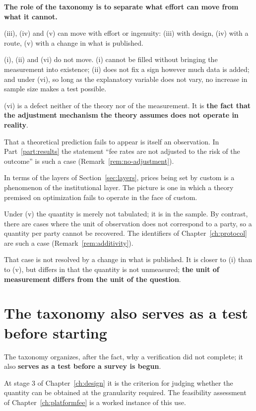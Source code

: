 \textbf{The role of the taxonomy is to separate what effort can move from what it cannot.}

(iii), (iv) and (v) can move with effort or ingenuity: (iii) with design, (iv) with a route,
(v) with a change in what is published.

(i), (ii) and (vi) do not move. (i) cannot be filled without bringing the measurement into
existence; (ii) does not fix a sign however much data is added; and under (vi), so long as
the explanatory variable does not vary, no increase in sample size makes a test possible.

\begin{remark}
\label{rem:vi-is-observation}
(vi) is a defect neither of the theory nor of the measurement. It is
\textbf{the fact that the adjustment mechanism the theory assumes does not operate in
reality}.

That a theoretical prediction fails to appear is itself an observation. In
Part~\ref{part:results} the statement ``fee rates are not adjusted to the risk of the
outcome'' is such a case (Remark~\ref{rem:no-adjustment}).

In terms of the layers of Section~\ref{sec:layers}, prices being set by custom is a
phenomenon of the institutional layer. The picture is one in which a theory premised on
optimization fails to operate in the face of custom.
\end{remark}

\begin{remark}
\label{rem:agg-impossible}
Under (v) the quantity is merely not tabulated; it is in the sample. By contrast, there are
cases where the unit of observation does not correspond to a party, so a quantity per party
cannot be recovered. The identifiers of Chapter~\ref{ch:protocol} are such a case
(Remark~\ref{rem:additivity}).

That case is not resolved by a change in what is published. It is closer to (i) than to (v),
but differs in that the quantity is not unmeasured;
\textbf{the unit of measurement differs from the unit of the question}.
\end{remark}

\section{The taxonomy also serves as a test before starting}

The taxonomy organizes, after the fact, why a verification did not complete; it also
\textbf{serves as a test before a survey is begun}.

At stage 3 of Chapter~\ref{ch:design} it is the criterion for judging whether the quantity
can be obtained at the granularity required. The feasibility assessment of
Chapter~\ref{ch:platformfee} is a worked instance of this use.

